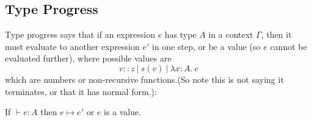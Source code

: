 \subsection{Type Progress} 
Type progress says that if an expression $e$ has type $A$ in a context $\Gamma$, then it must evaluate to another expression $e'$ in one step, or be a value (so $e$ cannot be evaluated further), where possible values are 
\[v :: z \ | \ s(v) \ | \ \lambda x : A. \ e\]
which are numbers or non-recursive functions.(So note this is not saying it terminates, or that it has normal form.):

\vspace{0.5cm}

\begin{thm}
If $\vdash e : A$ then $e \mapsto e'$ or $e$ is a value.
\end{thm}

